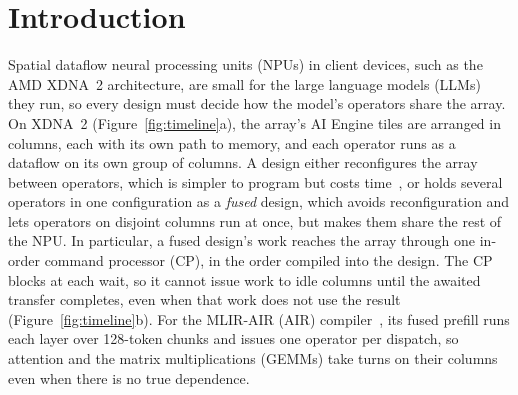 \section{Introduction}
\label{sec:intro}

Spatial dataflow neural processing units (NPUs) in client devices, such as the AMD XDNA\texttrademark{}~2 architecture, are small for the large language models (LLMs) they run, so every design must decide how the model's operators share the array.
On XDNA~2 (Figure~\ref{fig:timeline}a), the array's AI Engine tiles are arranged in columns, each with its own path to memory, and each operator runs as a dataflow on its own group of columns.
A design either reconfigures the array between operators, which is simpler to program but costs time~\citep{vandelm2026configwall}, or holds several operators in one configuration as a \emph{fused} design, which avoids reconfiguration and lets operators on disjoint columns run at once, but makes them share the rest of the NPU.
In particular, a fused design's work reaches the array through one in-order command processor (CP), in the order compiled into the design.
The CP blocks at each wait, so it cannot issue work to idle columns until the awaited transfer completes, even when that work does not use the result (Figure~\ref{fig:timeline}b).
For the MLIR-AIR (AIR) compiler~\citep{wang2026mlirair}, its fused prefill runs each layer over 128-token chunks and issues one operator per dispatch, so attention and the matrix multiplications (GEMMs) take turns on their columns even when there is no true dependence.
